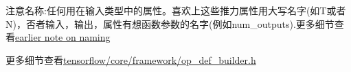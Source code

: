 \begin{itemize}
{\begin{lstlisting}[language=C++]
\end{lstlisting}
由于操作接受一个任何类型的tensor列表，只要我们有相同的:
\begin{lstlisting}[language=C++]
REGISTER_OP("SameTypeSequenceExample")
    .Attr("NumTensors: int")
    .Attr("T: type")
    .Input("in: NumTensors * T")

\end{lstlisting}
\item 为了参考一个tensor：Ref(<type>)，这里的<type>是之前类型中的一个
\end{itemize}
注意名称:任何用在输入类型中的属性。喜欢上这些推力属性用大写名字(如T或者N)，否者输入，输出，属性有想函数参数的名字(例如num\_outputs).更多细节查看\href{https://www.tensorflow.org/extend/adding_an_op?hl=zh-cn#naming}{earlier note on naming}

更多细节查看\href{https://www.github.com/tensorflow/tensorflow/blob/r1.4/tensorflow/core/framework/op_def_builder.h}{tensorflow/core/framework/op_def_builder.h}
